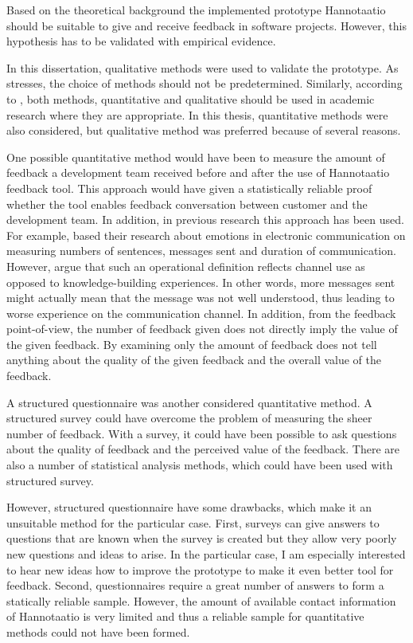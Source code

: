 \documentclass[english,12pt,a4paper,pdftex]{article}
\begin{document}
Based on the theoretical background the implemented prototype Hannotaatio should be suitable to give and receive feedback in software projects. However, this hypothesis has to be validated with empirical evidence. 

In this dissertation, qualitative methods were used to validate the prototype. As \citet{silverman2009} stresses, the choice of methods should not be predetermined. Similarly, according to \citet{gummesson1999}, both methods, quantitative and qualitative should be used in academic research where they are appropriate. In this thesis, quantitative methods were also considered, but qualitative method was preferred because of several reasons. 

One possible quantitative method would have been to measure the amount of feedback a development team received before and after the use of Hannotaatio feedback tool. This approach would have given a statistically reliable proof whether the tool enables feedback conversation between customer and the development team. In addition, in previous research this approach has been used. For example, \citet{rice1987} based their research about emotions in electronic communication on measuring numbers of sentences, messages sent and duration of communication. However, \citet{carlson1999} argue that such an operational definition reflects channel use as opposed to knowledge-building experiences. In other words, more messages sent might actually mean that the message was not well understood, thus leading to worse experience on the communication channel. In addition, from the feedback point-of-view, the number of feedback given does not directly imply the value of the given feedback. By examining only the amount of feedback does not tell anything about the quality of the given feedback and the overall value of the feedback. 

A structured questionnaire was another considered quantitative method. A structured survey could have overcome the problem of measuring the sheer number of feedback. With a survey, it could have been possible to ask questions about the quality of feedback and the perceived value of the feedback. There are also a number of statistical analysis methods, which could have been used with structured survey.

However, structured questionnaire have some drawbacks, which make it an unsuitable method for the particular case. First, surveys can give answers to questions that are known when the survey is created but they allow very poorly new questions and ideas to arise. In the particular case, I am especially interested to hear new ideas how to improve the prototype to make it even better tool for feedback. Second, questionnaires require a great number of answers to form a statically reliable sample. However, the amount of available contact information of Hannotaatio is very limited and thus a reliable sample for quantitative methods could not have been formed.
\end{document}
